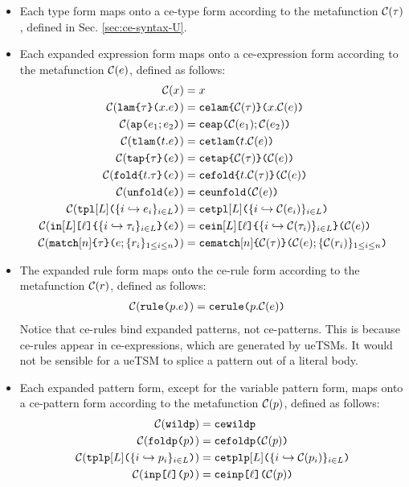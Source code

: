 {{{{\begin{itemize}
  \item Each type form maps onto a ce-type form according to the metafunction $\Cof{\tau}$, defined in Sec. \ref{sec:ce-syntax-U}.
  \item Each expanded expression form maps onto a ce-expression form according to the metafunction $\Cof{e}$, defined as follows:
  \begin{align*}
  \Cof{x} & = x\\
  \Cof{\aelam{\tau}{x}{e}} & = \acelam{\Cof{\tau}}{x}{\Cof{e}}\\
  \Cof{\aeap{e_1}{e_2}} & = \aceap{\Cof{e_1}}{\Cof{e_2}}\\
  \Cof{\aetlam{t}{e}} & = \acetlam{t}{\Cof{e}}\\
  \Cof{\aetap{e}{\tau}} & = \acetap{\Cof{e}}{\Cof{\tau}}\\
  \Cof{\aefold{t}{\tau}{e}} & = \acefold{t}{\Cof\tau}{\Cof e}\\
  \Cof{\aeunfold{e}} & = \aceunfold{\Cof{e}}\\
  \Cof{\aetpl{\labelset}{\mapschema{e}{i}{\labelset}}} & = \acetpl{\labelset}{\mapschemax{\Cofv}{e}{i}{\labelset}}\\
  \Cof{\aein{\labelset}{\ell}{\mapschema{\tau}{i}{\labelset}}{e}} &= \acein{\labelset}{\ell}{\mapschemax{\Cofv}{\tau}{i}{\labelset}}{\Cof{e}}\\
  \Cof{\aematchwith{n}{\tau}{e}{\seqschemaX{r}}} & = \acematchwith{n}{\Cof{\tau}}{\Cof{e}}{\seqschemaXx{\Cofv}{r}}
\end{align*}
  \item The expanded rule form maps onto the ce-rule form according to the metafunction $\Cof{r}$, defined as follows:
  \begin{align*}
  \Cof{\aematchrule{p}{e}} & = \acematchrule{p}{\Cof{e}}
  \end{align*}
  Notice that ce-rules bind expanded patterns, not ce-patterns. This is because ce-rules appear in ce-expressions, which are generated by ueTSMs. It would not be sensible for a ueTSM to splice a pattern out of a literal body.
  \item Each expanded pattern form, except for the variable pattern form, maps onto a ce-pattern form according to the metafunction $\Cof{p}$, defined as follows:
  \begin{align*}
  \Cof{\aewildp} & = \acewildp\\
  \Cof{\aefoldp{p}} & = \acefoldp{\Cof{p}}\\
  \Cof{\aetplp{\labelset}{\mapschema{p}{i}{\labelset}}} & = \acetplp{\labelset}{\mapschemax{\Cofv}{p}{i}{\labelset}}\\
  \Cof{\aeinjp{\ell}{p}} & = \aceinjp{\ell}{\Cof{p}}
  \end{align*}
\end{itemize}

}}}}
